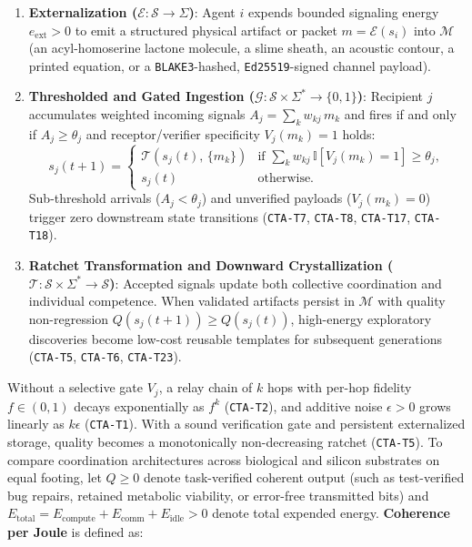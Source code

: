 \documentclass[10pt,letterpaper]{article}
\providecommand{\tightlist}{\setlength{\itemsep}{1pt}\setlength{\parskip}{0pt}}
\begin{document}
\begin{enumerate}
\def\labelenumi{\arabic{enumi}.}
\tightlist
\item
  \textbf{Externalization (\(\mathcal{E} : \mathcal{S} \to \Sigma\))}:
  Agent \(i\) expends bounded signaling energy \(e_{\text{ext}} > 0\) to
  emit a structured physical artifact or packet \(m = \mathcal{E}(s_i)\)
  into \(\mathcal{M}\) (an acyl-homoserine lactone molecule, a slime
  sheath, an acoustic contour, a printed equation, or a
  \texttt{BLAKE3}-hashed, \texttt{Ed25519}-signed channel payload).
\item
  \textbf{Thresholded and Gated Ingestion
  (\(\mathcal{G} : \mathcal{S} \times \Sigma^* \to \{0,1\}\))}:
  Recipient \(j\) accumulates weighted incoming signals
  \(A_j = \sum_k w_{kj}\,m_k\) and fires if and only if
  \(A_j \ge \theta_j\) and receptor/verifier specificity
  \(V_j(m_k) = 1\) holds:
  \[s_j(t + 1) = \begin{cases} \mathcal{T}\!\left(s_j(t),\, \{m_k\}\right) & \text{if } \sum_k w_{kj}\,\mathbb{I}[V_j(m_k)=1] \ge \theta_j, \\ s_j(t) & \text{otherwise.} \end{cases}\]
  Sub-threshold arrivals (\(A_j < \theta_j\)) and unverified payloads
  (\(V_j(m_k) = 0\)) trigger zero downstream state transitions
  (\texttt{CTA-T7}, \texttt{CTA-T8}, \texttt{CTA-T17},
  \texttt{CTA-T18}).
\item
  \textbf{Ratchet Transformation and Downward Crystallization
  (\(\mathcal{T} : \mathcal{S} \times \Sigma^* \to \mathcal{S}\))}:
  Accepted signals update both collective coordination and individual
  competence. When validated artifacts persist in \(\mathcal{M}\) with
  quality non-regression \(Q(s_j(t+1)) \ge Q(s_j(t))\), high-energy
  exploratory discoveries become low-cost reusable templates for
  subsequent generations (\texttt{CTA-T5}, \texttt{CTA-T6},
  \texttt{CTA-T23}).
\end{enumerate}

Without a selective gate \(V_j\), a relay chain of \(k\) hops with
per-hop fidelity \(f \in (0, 1)\) decays exponentially as \(f^k\)
(\texttt{CTA-T2}), and additive noise \(\epsilon > 0\) grows linearly as
\(k\epsilon\) (\texttt{CTA-T1}). With a sound verification gate and
persistent externalized storage, quality becomes a monotonically
non-decreasing ratchet (\texttt{CTA-T5}). To compare coordination
architectures across biological and silicon substrates on equal footing,
let \(Q \ge 0\) denote task-verified coherent output (such as
test-verified bug repairs, retained metabolic viability, or error-free
transmitted bits) and
\(E_{\text{total}} = E_{\text{compute}} + E_{\text{comm}} + E_{\text{idle}} > 0\)
denote total expended energy. \textbf{Coherence per Joule} is defined
as:
\end{document}
